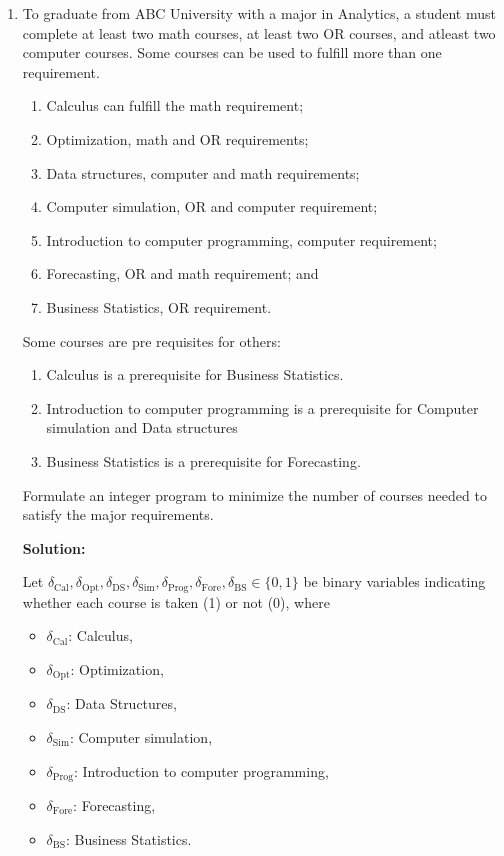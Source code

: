 \documentclass{article}
\begin{document}
\begin{enumerate}
Finally, the constraint $z_1 + z_2 \geq 1$ ensures that at least one of the two conditions must hold: either Condition 1 (at least one of investments 1, 2, 3 is chosen) or Condition 2 (at least two of investments 2, 4, 5, 6 are chosen).


\item To graduate from ABC University with a major in Analytics, a student must complete at least two math courses, at least two OR courses, and atleast two computer courses. Some courses can be used to fulfill more than one requirement.
\begin{enumerate}
\item Calculus can fulfill the math requirement;
\item Optimization, math and OR requirements;
\item Data structures, computer and math requirements;
\item Computer simulation, OR and computer requirement;
\item Introduction to computer programming, computer requirement;
\item Forecasting, OR and math requirement; and
\item Business Statistics, OR requirement.
\end{enumerate}
Some courses are pre requisites for others:
\begin{enumerate}
\item Calculus is a prerequisite for Business Statistics.
\item Introduction to computer programming is a prerequisite for Computer simulation and Data structures
\item Business Statistics is a prerequisite for Forecasting.
\end{enumerate}
Formulate an integer program to minimize the number of courses needed to satisfy the major requirements.

\textbf{Solution:}

Let $\delta_{\mathrm{Cal}}, \delta_{\mathrm{Opt}}, \delta_{\mathrm{DS}}, \delta_{\mathrm{Sim}}, \delta_{\mathrm{Prog}}, \delta_{\mathrm{Fore}}, \delta_{\mathrm{BS}} \in \{0,1\}$ be binary variables indicating whether each course is taken (1) or not (0), where
\begin{itemize}
    \item $\delta_{\mathrm{Cal}}$: Calculus,
    \item $\delta_{\mathrm{Opt}}$: Optimization,
    \item $\delta_{\mathrm{DS}}$: Data Structures,
    \item $\delta_{\mathrm{Sim}}$: Computer simulation,
    \item $\delta_{\mathrm{Prog}}$: Introduction to computer programming,
    \item $\delta_{\mathrm{Fore}}$: Forecasting,
    \item $\delta_{\mathrm{BS}}$: Business Statistics.
\end{itemize}


\end{enumerate}
\end{document}
